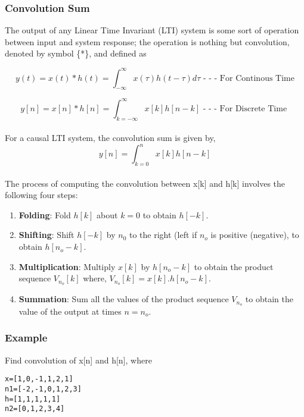 \documentclass[a4paper,11pt]{article}
\begin{document}
\subsubsection{Convolution Sum}
The output of any Linear Time Invariant (LTI) system is some sort of operation between
input and system response; the operation is nothing but convolution, denoted by symbol \{*\}, and defined as

\begin{equation*}
    y(t)=x(t)*h(t)=\int_{-\infty}^{\infty}x(\tau)h(t-\tau)d\tau \text{   - - - For Continous Time}
\end{equation*}

\begin{equation*}
    y[n]=x[n] * h[n]=\int_{k=-\infty}^{\infty}x[k]h[n-k]  \text{   - - - For Discrete Time }
\end{equation*}
\\
For a causal LTI system, the convolution sum is given by,
\begin{equation*}
    y[n]=\int_{k=0}^{n}x[k]h[n-k]
\end{equation*}
\\
The process of computing the convolution between x[k] and h[k] involves the following four
steps:

\begin{enumerate}
    \item \textbf{Folding}: Fold $h[k]$ about $k=0$ to obtain $h[-k]$.
    \item \textbf{Shifting}: Shift $h[-k]$ by $n_0$ to the right (left if $n_o$ is positive (negative), to obtain $h[n_o-k]$.
    \item \textbf{Multiplication}: Multiply $x[k]$ by $h[n_o-k]$ to obtain the product sequence $V_{n_o}[k]$ where, $V_{n_o}[k]=x[k].h[n_o-k]$.
    \item \textbf{Summation}: Sum all the values of the product sequence $V_{n_o}$ to obtain the value of  the output at times $n=n_o$.
\end{enumerate}

\subsubsection{Example} Find convolution of x[n] and h[n], where
\begin{verbatim}
x=[1,0,-1,1,2,1]
n1=[-2,-1,0,1,2,3]
h=[1,1,1,1,1]
n2=[0,1,2,3,4]
\end{verbatim}
\end{document}
